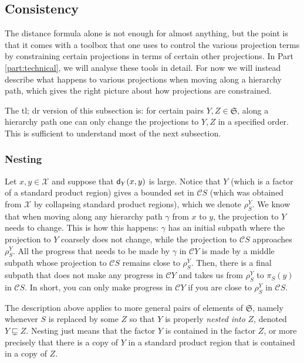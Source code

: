 \documentclass[11pt,oneside]{amsart}
\theoremstyle{definition}
\newcommand{\dist}{\textup{\textsf{d}}}
\newcommand{\cuco}[1]{{\mathcal #1}}
\newcommand{\fontact}{{\mathcal C}}
\newcommand{\propnest}{\sqsubsetneq}
\begin{document}
\subsection{Consistency}
The distance formula alone is not enough for almost anything, but the point is that it comes with a toolbox that one uses to control the various projection terms by constraining certain projections in terms of certain other projections. In Part \ref{part:technical}, we will analyse these tools in detail. For now we will instead describe what happens to various projections when moving along a hierarchy path, which gives the right picture about how projections are constrained.

The tl; dr version of this subsection is: for certain pairs $Y,Z\in\mathfrak S$, along a hierarchy path one can only change the projections to $Y,Z$ in a specified order. This is sufficient to understand most of the next subsection.

\subsubsection{Nesting} Let $x,y\in\cuco X$ and suppose that $\dist_Y(x,y)$ is large. Notice that $Y$ (which is a factor of a standard product region) gives a bounded set in $\fontact S$ (which was obtained from $\cuco X$ by collapsing standard product regions), which we denote $\rho^Y_S$. We know that when moving along any hierarchy path $\gamma$ from $x$ to $y$, the projection to $Y$ needs to change. This is how this happens: $\gamma$ has an initial subpath where the projection to $Y$ coarsely does not change, while the projection to $\fontact S$ approaches $\rho^Y_S$. All the progress that needs to be made by $\gamma$ in $\fontact Y$ is made by a middle subpath whose projection to $\fontact S$ remains close to $\rho^Y_S$. Then, there is a final subpath that does not make any progress in $\fontact Y$ and takes us from $\rho^Y_S$ to $\pi_S(y)$ in $\fontact S$. In short, you can only make progress in $\fontact Y$ if you are close to $\rho^Y_S$ in $\fontact S$.

The description above applies to more general pairs of elements of $\mathfrak S$, namely whenever $S$ is replaced by some $Z$ so that $Y$ is properly \emph{nested into} $Z$, denoted $Y\propnest Z$. Nesting just means that the factor $Y$ is contained in the factor $Z$, or more precisely that there is a copy of $Y$ in a standard product region that is contained in a copy of $Z$. 
\end{document}
